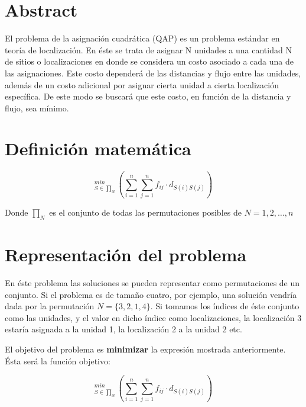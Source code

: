 \documentclass[10pt,a4paper]{article}
\author{%
    \href{http://elbauldelprogramador.com}{Alejandro Alcalde}\\%
    \vspace{20pt}
    }
\makeatletter
\def\printtitle{%
    {\color{bl} \centering \huge \sc \textbf{\@title}\par}}     %
\def\printauthor{%
    {\centering \small \@author}}               %
\makeatother
\begin{document}
\thispagestyle{empty}

\titleBC
\newpage
\tableofcontents
\newpage

\section{Abstract}

El problema de la asignación cuadrática (QAP) es un problema estándar en teoría de localización. En éste se trata de asignar N unidades a una cantidad N de sitios o localizaciones en donde se considera un costo asociado a cada una de las asignaciones. Este costo dependerá de las distancias y flujo entre las unidades, además de un costo adicional por asignar cierta unidad a cierta localización específica. De este modo se buscará que este costo, en función de la distancia y flujo, sea mínimo.

\section{Definición matemática}

\begin{displaymath}
_{S\in\prod _N}^{min}\left ( \sum_{i=1}^n \sum_{j=1}^n f_{ij} \cdot d_{S(i)S(j)}  \right )
\end{displaymath}

Donde $\prod _N$ es el conjunto de todas las permutaciones posibles de $N={1,2,\dots,n}$

\section{Representación del problema}

En éste problema las soluciones se pueden representar como permutaciones de un conjunto. Si el problema es de tamaño cuatro, por ejemplo, una solución vendría dada por la permutación $N=\{3,2,1,4\}$. Si tomamos los índices de éste conjunto como las unidades, y el valor en dicho índice como localizaciones, la localización 3 estaría asignada a la unidad 1, la localización 2 a la unidad 2 etc.

El objetivo del problema es \textbf{minimizar} la expresión mostrada anteriormente. Ésta será la función objetivo:

\begin{displaymath}
_{S\in\prod _N}^{min}\left ( \sum_{i=1}^n \sum_{j=1}^n f_{ij} \cdot d_{S(i)S(j)}  \right )
\end{displaymath}
\end{document}
